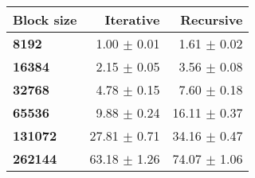 \begin{tabular}{lrr}\toprule
\textbf{Block size}  & \textbf{Iterative} & \textbf{Recursive}\\\midrule
\textbf{8192}  & 1.00 $\pm$ 0.01 & 1.61 $\pm$ 0.02\\
\textbf{16384}  & 2.15 $\pm$ 0.05 & 3.56 $\pm$ 0.08\\
\textbf{32768}  & 4.78 $\pm$ 0.15 & 7.60 $\pm$ 0.18\\
\textbf{65536}  & 9.88 $\pm$ 0.24 & 16.11 $\pm$ 0.37\\
\textbf{131072}  & 27.81 $\pm$ 0.71 & 34.16 $\pm$ 0.47\\
\textbf{262144} & 63.18 $\pm$ 1.26 & 74.07 $\pm$ 1.06\\
\bottomrule
\end{tabular}
